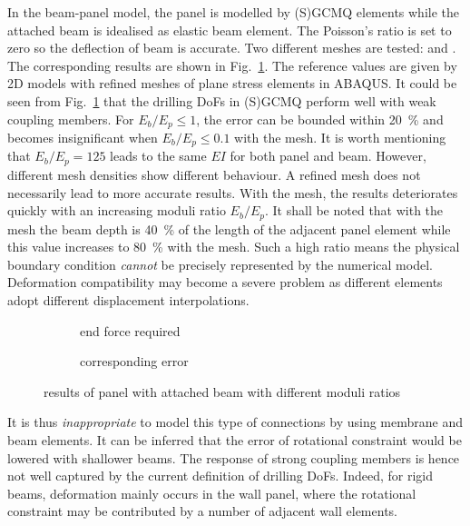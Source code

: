 \documentclass[3p,sort&compress,review,11pt,fleqn]{elsarticle}
\newcommand*{\figref}[1]{Fig.~\ref{#1}}
\begin{document}
In the beam-panel model, the panel is modelled by (S)GCMQ elements while the attached beam is idealised as elastic beam element. The Poisson's ratio is set to zero so the deflection of beam is accurate. Two different meshes are tested:  and . The corresponding results are shown in \figref{fig:coupled_test}. The reference values are given by 2D models with refined meshes of plane stress elements in ABAQUS. It could be seen from \figref{fig:coupled_test} that the drilling DoFs in (S)GCMQ perform well with weak coupling members. For $E_b/E_p\leqslant\num{1}$, the error can be bounded within \SI{20}{\percent} and becomes insignificant when $E_b/E_p\leqslant\num{0.1}$ with the  mesh. It is worth mentioning that $E_b/E_p=\num{125}$ leads to the same $EI$ for both panel and beam. However, different mesh densities show different behaviour. A refined mesh does not necessarily lead to more accurate results. With the  mesh, the results deteriorates quickly with an increasing moduli ratio $E_b/E_p$. It shall be noted that with the  mesh the beam depth is \SI{40}{\percent} of the length of the adjacent panel element while this value increases to \SI{80}{\percent} with the  mesh. Such a high ratio means the physical boundary condition \textit{cannot} be precisely represented by the numerical model. Deformation compatibility may become a severe problem as different elements adopt different displacement interpolations.
\begin{figure}[htb]
\centering\scriptsize
\begin{subfigure}{.49\textwidth}\centering

\caption{end force required}
\end{subfigure}\hfill
\begin{subfigure}{.49\textwidth}\centering

\caption{corresponding error}
\end{subfigure}
\caption{results of panel with attached beam with different moduli ratios}\label{fig:coupled_test}
\end{figure}

It is thus \textit{inappropriate} to model this type of connections by using membrane and beam elements. It can be inferred that the error of rotational constraint would be lowered with shallower beams. The response of strong coupling members is hence not well captured by the current definition of drilling DoFs. Indeed, for rigid beams, deformation mainly occurs in the wall panel, where the rotational constraint may be contributed by a number of adjacent wall elements.
\end{document}
